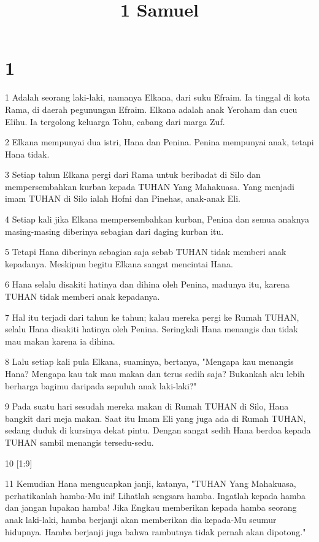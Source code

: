 

\title{1 Samuel}


\chapter{1}

\par 1 Adalah seorang laki-laki, namanya Elkana, dari suku Efraim. Ia tinggal di kota Rama, di daerah pegunungan Efraim. Elkana adalah anak Yeroham dan cucu Elihu. Ia tergolong keluarga Tohu, cabang dari marga Zuf.
\par 2 Elkana mempunyai dua istri, Hana dan Penina. Penina mempunyai anak, tetapi Hana tidak.
\par 3 Setiap tahun Elkana pergi dari Rama untuk beribadat di Silo dan mempersembahkan kurban kepada TUHAN Yang Mahakuasa. Yang menjadi imam TUHAN di Silo ialah Hofni dan Pinehas, anak-anak Eli.
\par 4 Setiap kali jika Elkana mempersembahkan kurban, Penina dan semua anaknya masing-masing diberinya sebagian dari daging kurban itu.
\par 5 Tetapi Hana diberinya sebagian saja sebab TUHAN tidak memberi anak kepadanya. Meskipun begitu Elkana sangat mencintai Hana.
\par 6 Hana selalu disakiti hatinya dan dihina oleh Penina, madunya itu, karena TUHAN tidak memberi anak kepadanya.
\par 7 Hal itu terjadi dari tahun ke tahun; kalau mereka pergi ke Rumah TUHAN, selalu Hana disakiti hatinya oleh Penina. Seringkali Hana menangis dan tidak mau makan karena ia dihina.
\par 8 Lalu setiap kali pula Elkana, suaminya, bertanya, "Mengapa kau menangis Hana? Mengapa kau tak mau makan dan terus sedih saja? Bukankah aku lebih berharga bagimu daripada sepuluh anak laki-laki?"
\par 9 Pada suatu hari sesudah mereka makan di Rumah TUHAN di Silo, Hana bangkit dari meja makan. Saat itu Imam Eli yang juga ada di Rumah TUHAN, sedang duduk di kursinya dekat pintu. Dengan sangat sedih Hana berdoa kepada TUHAN sambil menangis tersedu-sedu.
\par 10 [1:9]
\par 11 Kemudian Hana mengucapkan janji, katanya, "TUHAN Yang Mahakuasa, perhatikanlah hamba-Mu ini! Lihatlah sengsara hamba. Ingatlah kepada hamba dan jangan lupakan hamba! Jika Engkau memberikan kepada hamba seorang anak laki-laki, hamba berjanji akan memberikan dia kepada-Mu seumur hidupnya. Hamba berjanji juga bahwa rambutnya tidak pernah akan dipotong."
